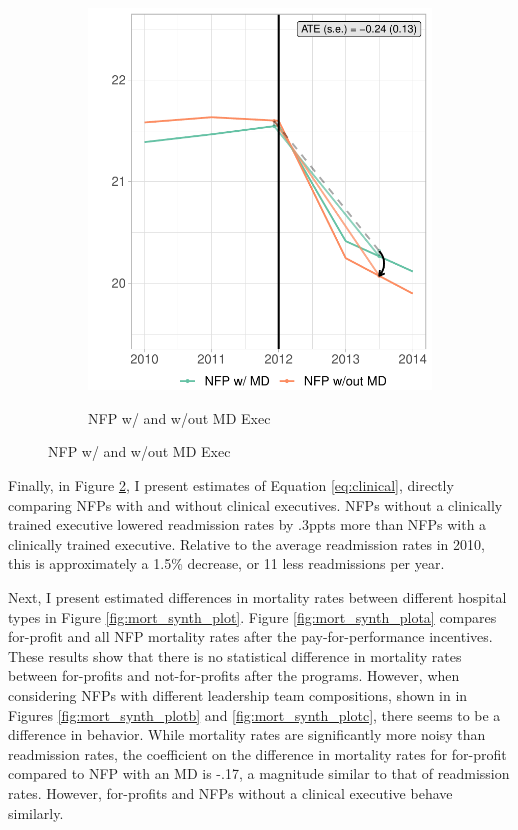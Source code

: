 \documentclass[12pt]{article}
\begin{document}
\begin{figure}
\begin{subfigure}[b]{0.45\textwidth}
         \label{fig:read_synth_plotc}
     \end{subfigure}
     \hfill
     \begin{subfigure}[b]{0.45\textwidth}
         \centering
         \caption{NFP w/ and w/out MD Exec}
         \includegraphics[width=\textwidth]{Objects/read_md_nomd_synth_graph.pdf}
         \label{fig:read_synth_plotd}
     \end{subfigure}
        \label{fig:read_synth_plot}
    \end{figure}

    Finally, in Figure \ref{fig:read_synth_plotd}, I present estimates of Equation \ref{eq:clinical}, directly comparing NFPs with and without clinical executives. NFPs without a clinically trained executive lowered readmission rates by .3ppts more than NFPs with a clinically trained executive. Relative to the average readmission rates in 2010, this is approximately a 1.5\% decrease, or 11 less readmissions per year. 

    Next, I present estimated differences in mortality rates between different hospital types in Figure \ref{fig:mort_synth_plot}. Figure \ref{fig:mort_synth_plota} compares for-profit and all NFP mortality rates after the pay-for-performance incentives. These results show that there is no statistical difference in mortality rates between for-profits and not-for-profits after the programs. However, when considering NFPs with different leadership team compositions, shown in in Figures \ref{fig:mort_synth_plotb} and \ref{fig:mort_synth_plotc}, there seems to be a difference in behavior. While mortality rates are significantly more noisy than readmission rates, the coefficient on the difference in mortality rates for for-profit compared to NFP with an MD is -.17, a magnitude similar to that of readmission rates. However, for-profits and NFPs without a clinical executive behave similarly. 
\end{document}
